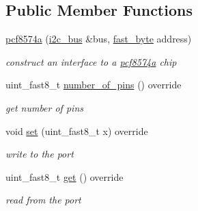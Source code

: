 \subsection*{Public Member Functions}
\begin{DoxyCompactItemize}
\item 
\hyperlink{classhwlib_1_1pcf8574a_abbfb14e05ed1afe9915353028264dc7b}{pcf8574a} (\hyperlink{classhwlib_1_1i2c__bus}{i2c\+\_\+bus} \&bus, \hyperlink{hwlib-defines_8hpp_a54998f25522db04b7b797b0fcc9eb3d5}{fast\+\_\+byte} address)
\begin{DoxyCompactList}\small\item\em construct an interface to a \hyperlink{classhwlib_1_1pcf8574a}{pcf8574a} chip \end{DoxyCompactList}\item 
uint\+\_\+fast8\+\_\+t \hyperlink{classhwlib_1_1pcf8574a_a1bb2266c127d93fd1d7c0b3f9193817d}{number\+\_\+of\+\_\+pins} () override
\begin{DoxyCompactList}\small\item\em get number of pins \end{DoxyCompactList}\item 
void \hyperlink{classhwlib_1_1pcf8574a_afeef7665cd9059959588295418c57709}{set} (uint\+\_\+fast8\+\_\+t x) override
\begin{DoxyCompactList}\small\item\em write to the port \end{DoxyCompactList}\item 
uint\+\_\+fast8\+\_\+t \hyperlink{classhwlib_1_1pcf8574a_abd2c5f791eced2e91f52db767351f0bd}{get} () override
\begin{DoxyCompactList}\small\item\em read from the port \end{DoxyCompactList}\end{DoxyCompactItemize}
